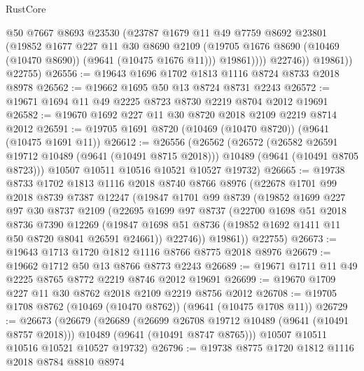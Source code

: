 \begin{lexlean}{RustCore}
\begin{coremodule}
                  @50
                  @7667
                  @8693
                  @23530
                  (@23787
                    @1679
                    @11
                    @49
                    @7759
                    @8692
                    @23801
                    (@19852
                      @1677
                      @227
                      @11
                      @30
                      @8690
                      @2109
                      (@19705 @1676 @8690 (@10469 (@10470 @8690)) (@9641 (@10475 @1676 @11)))
                      @19861))))
              @22746))
          @19861))
      @22755)
@26556 := @19643 @1696 @1702 @1813 @1116 @8724 @8733 @2018 @8978
@26562 := @19662 @1695 @50 @13 @8724 @8731 @2243
@26572 := @19671 @1694 @11 @49 @2225 @8723 @8730 @2219 @8704 @2012 @19691
@26582 := @19670 @1692 @227 @11 @30 @8720 @2018 @2109 @2219 @8714 @2012
@26591 := @19705 @1691 @8720 (@10469 (@10470 @8720)) (@9641 (@10475 @1691 @11))
@26612 := @26556
    (@26562
      (@26572
        (@26582 @26591 @19712 @10489 (@9641 (@10491 @8715 @2018)))
        @10489
        (@9641 (@10491 @8705 @8723)))
      @10507
      @10511
      @10516
      @10521
      @10527
      @19732)
@26665 := @19738
    @8733
    @1702
    @1813
    @1116
    @2018
    @8740
    @8766
    @8976
    (@22678
      @1701
      @99
      @2018
      @8739
      @7387
      @12247
      (@19847
        @1701
        @99
        @8739
        (@19852
          @1699
          @227
          @97
          @30
          @8737
          @2109
          (@22695
            @1699
            @97
            @8737
            (@22700
              @1698
              @51
              @2018
              @8736
              @7390
              @12269
              (@19847 @1698 @51 @8736 (@19852 @1692 @1411 @11 @50 @8720 @8041 @26591 @24661))
              @22746))
          @19861))
      @22755)
@26673 := @19643 @1713 @1720 @1812 @1116 @8766 @8775 @2018 @8976
@26679 := @19662 @1712 @50 @13 @8766 @8773 @2243
@26689 := @19671 @1711 @11 @49 @2225 @8765 @8772 @2219 @8746 @2012 @19691
@26699 := @19670 @1709 @227 @11 @30 @8762 @2018 @2109 @2219 @8756 @2012
@26708 := @19705 @1708 @8762 (@10469 (@10470 @8762)) (@9641 (@10475 @1708 @11))
@26729 := @26673
    (@26679
      (@26689
        (@26699 @26708 @19712 @10489 (@9641 (@10491 @8757 @2018)))
        @10489
        (@9641 (@10491 @8747 @8765)))
      @10507
      @10511
      @10516
      @10521
      @10527
      @19732)
@26796 := @19738
    @8775
    @1720
    @1812
    @1116
    @2018
    @8784
    @8810
    @8974

\end{coremodule}
\end{lexlean}
